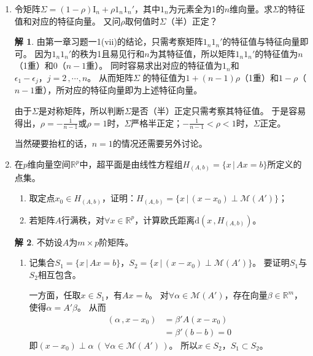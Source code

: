 \documentclass[10pt]{article}
\theoremstyle{definition}
\newtheorem*{solution}{解}
\theoremstyle{definition}
\begin{document}
\begin{enumerate}
    \item	%
        令矩阵$\Sigma =(1-\rho)\mathrm{I}_n+\rho 1_n1_n'$，其中$1_n$为元素全为1的$n$维向量。求$\Sigma$的特征值和对应的特征向量。
        又问$\rho$取何值时$\Sigma$（半）正定？

        \begin{solution}
            由第一章习题一1(vii)的结论，只需考察矩阵$1_n1_n'$的特征值与特征向量即可。
            因为$1_n1_n'$的秩为1且易见行和$n$为其特征值，所以矩阵$1_n1_n'$的特征值为$n$（1重）和0（$n-1$重）。
            同时容易求出对应的特征值为$1_n$和$\epsilon_1-\epsilon_j\text{，}j=2\, ,\cdots ,n$。
            从而矩阵$\Sigma$	的特征值为$1+(n-1)\rho$（1重）和$1-\rho$（$n-1$重），所对应的特征向量即为上述特征向量。

            由于$\Sigma$是对称矩阵，所以判断$\Sigma$是否（半）正定只需考察其特征值。
            于是容易得出，$\rho=-\frac{1}{n-1}$或$\rho=1$时，$\Sigma$严格半正定；$-\frac{1}{n-1} < \rho <1$时，$\Sigma$正定。

            当然硬要抬杠的话，$n=1$的情况还需要另外讨论。
        \end{solution}

    \item	%
        在$p$维向量空间$\mathbb{R}^p$中，超平面是由线性方程组$H_{(A,b)}=\{x\, |\, Ax=b\}$所定义的点集。
        \begin{enumerate}[label=(\roman*)]
            \item 取定点$x_0\in H_{(A,b)}$，证明：$H_{(A,b)}=\{x\, |\, (x-x_0) \perp \mathcal{M}(A')\}$；\\
            \item 若矩阵$A$行满秩，对$\forall x\in \mathbb{R}^p$，计算欧氏距离$\mathrm{d}(x\, ,H_{(A,b)})$。
        \end{enumerate}

        \begin{solution}
            不妨设$A$为$m\times p$阶矩阵。

            \begin{enumerate}[label=(\roman*)]
                \item
                    记集合$S_1=\{x\, |\, Ax=b\}$，$S_2=\{x\, |\, (x-x_0) \perp \mathcal{M}(A')\}$。
                    要证明$S_1$与$S_2$相互包含。

                    一方面，任取$x\in S_1$，有$Ax=b$。
                    对$\forall \alpha \in \mathcal{M}(A')$，存在向量$\beta \in \mathbb{R}^m$，使得$\alpha =A'\beta$。
                    从而
                    \begin{equation*}
                        \begin{aligned}
                            (\alpha \, ,x-x_0) & = \beta'A(x-x_0) \\
                                               & = \beta'(b-b) =0
                        \end{aligned}
                    \end{equation*}
                    即$(x-x_0)\perp \alpha \ (\, \forall \alpha \in \mathcal{M}(A')\, )$。
                    所以$x \in S_2$，$S_1 \subset S_2$。


\end{enumerate}
\end{solution}
\end{enumerate}
\end{document}
